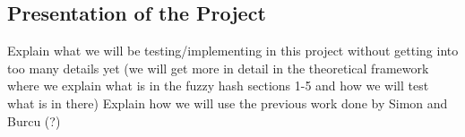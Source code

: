 




\subsection{Presentation of the Project}
Explain what we will be testing/implementing in this project without getting into too many details yet (we will get more in detail in the theoretical framework where we explain what is in the fuzzy hash sections 1-5 and how we will test what is in there)
Explain how we will use the previous work done by Simon and Burcu (?) 



